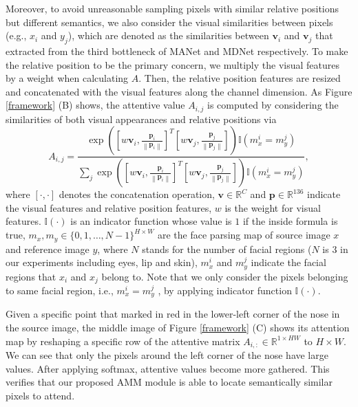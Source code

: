 Moreover, to avoid unreasonable sampling pixels with similar relative positions but different semantics, we also consider the visual similarities between pixels (e.g., $x_i$ and $y_j$), which are denoted as the similarities between $\mathbf{v}_i$  and $\mathbf{v}_j$ that extracted from the third bottleneck of MANet and MDNet respectively.
To make the relative position to be the primary concern, we multiply the visual features by a weight when calculating $A$.
Then, the relative position features are resized and concatenated with the visual features along the channel dimension.
As Figure \ref{framework} (B) shows, the attentive value $A_{i,j}$ is computed by considering the similarities of both visual appearances and relative positions via
\begin{equation}
A_{i, j} = \frac{\exp \left( [w\mathbf{v}_i, \frac{\mathbf{p}_i}{\left\| \mathbf{p}_i \right\|} ]^T [w\mathbf{v}_j, \frac{\mathbf{p}_j}{\left\| \mathbf{p}_j \right\|}]  \right) \mathbb{I}  (m^i_x = m^j_y) }{\sum_{j} \exp \left( [w\mathbf{v}_i, \frac{\mathbf{p}_i}{\left\| \mathbf{p}_i \right\|} ]^T [w\mathbf{v}_j, \frac{\mathbf{p}_j}{\left\| \mathbf{p}_j \right\|}] \right) \mathbb{I}  (m^i_x = m^j_y)},
\label{equ5}
\end{equation}
where $[\cdot, \cdot]$ denotes the concatenation operation, $\mathbf{v} \in \mathbb{R}^{C}$ and $\mathbf{p} \in \mathbb{R}^{136} $ indicate the visual features and relative position features, $w$ is the weight for visual features.
$\mathbb{I}(\cdot)$ is an indicator function whose value is $1$ if the inside formula is true, $m_x, m_y \in \{0, 1, \dots, N-1\}^{H \times W}$ are the face parsing map of source image $x$ and reference image $y$, where $N$ stands for the number of facial regions ($N$ is $3$ in our experiments including eyes, lip and skin), $m^i_x$ and $m^j_y$ indicate the facial regions that $x_i$ and $x_j$ belong to. Note that we only consider the pixels belonging to same facial region, i.e., $m^i_x = m^j_y$ , by applying indicator function $\mathbb{I}(\cdot)$.

Given a specific point that marked in red in the lower-left corner of the nose in the source image, 
the middle image of Figure \ref{framework} (C) shows its attention map by reshaping a specific row of the attentive matrix $A_{i,:} \in \mathbb{R}^{1 \times HW}$ to $H \times W$.
We can see that only the pixels around the left corner of the nose have large values. After applying softmax, attentive values become more gathered.
This verifies that our proposed AMM module is able to locate semantically similar pixels to attend.

